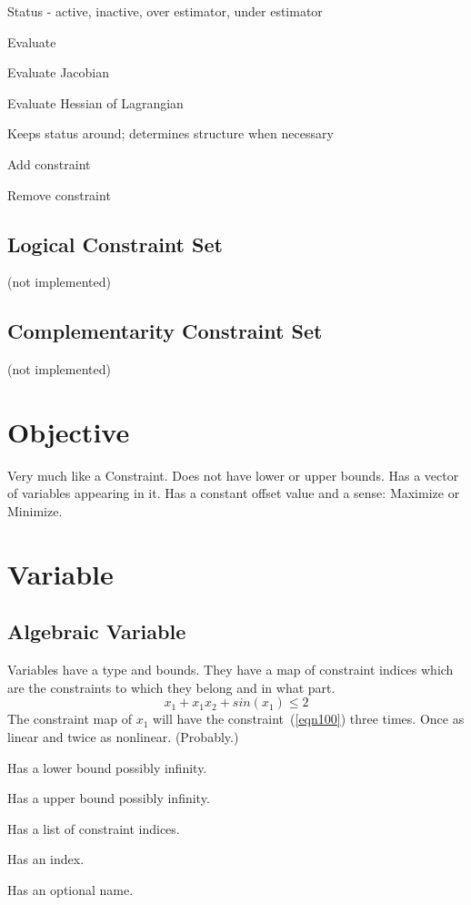 \documentclass[10pt]{report}
\newcommand{\notimpl}[0]{(not implemented)}
\begin{document}
Status - active, inactive, over estimator, under estimator

Evaluate 

Evaluate Jacobian

Evaluate Hessian of Lagrangian

Keeps status around; determines structure when necessary

Add constraint

Remove constraint

\subsection{Logical Constraint Set} \notimpl

\subsection{Complementarity Constraint Set} \notimpl

\section{Objective}
Very much like a Constraint. Does not have lower or upper bounds. Has a vector
of variables appearing in it. Has a constant offset value and a sense:
Maximize or Minimize.


\section{Variable}

\subsection{Algebraic Variable}
Variables have a type and bounds.  They have a map of constraint
indices which are the constraints to which they belong and in what part.
\begin{equation}
\label{eqn100}
x_1 + x_1x_2 + sin(x_1) \leq 2 
\end{equation}
The constraint map of $x_1$ will have the constraint~(\ref{eqn100}) three
times. Once as linear and twice as nonlinear. (Probably.)

Has a lower bound possibly infinity.

Has a upper bound possibly infinity.

Has a list of constraint indices.

Has an index.

Has an optional name.
\end{document}
